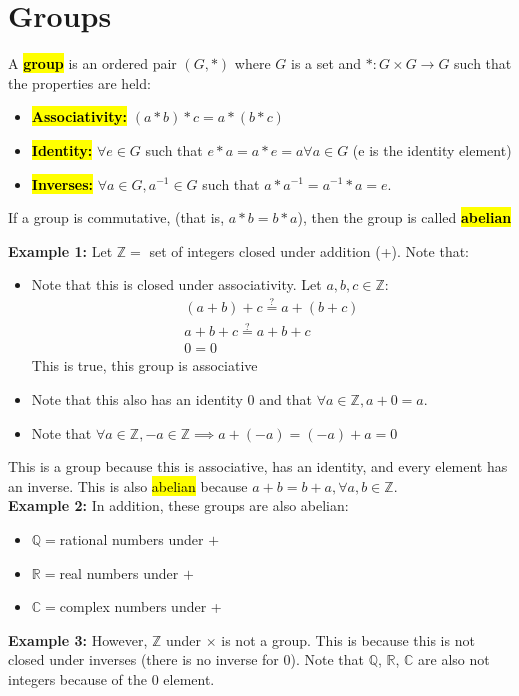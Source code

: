 \documentclass[12pt]{report}
\newcommand{\remarks}[1]{{\leavevmode\color{blue} #1}}
\newcommand{\examples}[1]{{\leavevmode\color{red} #1}}
\newcommand{\notes}[1]{{\leavevmode\color{OliveGreen} #1}}
\begin{document}
	\section{Groups}
	\notes{
		A \hl{\textbf{group}} is an ordered pair $(G,*)$ where $G$ is a set and $*:G\times G\to G$ such that the properties are held: 
		\begin{itemize}
			\item \hl{\textbf{Associativity: }}$(a*b)*c=a*(b*c)$
			\item \hl{\textbf{Identity: }}$\forall e\in G$ such that $e*a=a*e=a\forall a\in G$ (e is the identity element)
			\item \hl{\textbf{Inverses: }}$\forall a\in G, a^{-1}\in G$ such that $a*a^{-1}=a^{-1}*a=e$. 
		\end{itemize}
	}
	\remarks{
		If a group is commutative, (that is, $a*b=b*a$), then the group is called \hl{\textbf{abelian}}
	}\\
	\vskip 0.2in
	\examples{
		\textbf{Example 1: }Let $\mathbb{Z}=$ set of integers closed under addition (+). Note that: 
		\begin{itemize}
			\item Note that this is closed under associativity. Let $a,b,c\in \mathbb{Z}$: 
			\begin{gather}
				(a+b)+c\stackrel{?}{=}a+(b+c)\\
				a+b+c\stackrel{?}{=}a+b+c\\
				0=0
			\end{gather}
			This is true, this group is associative
			\item Note that this also has an identity $0$ and that $\forall a\in \mathbb{Z}, a+0=a$.\\ 
			\item  Note that $\forall a\in \mathbb{Z}, -a\in \mathbb{Z}\implies a+(-a)=(-a)+a=0$
		\end{itemize}
		This is a group because this is associative, has an identity, and every element has an inverse. This is also \hl{abelian} because $a+b=b+a, \forall a,b\in \mathbb{Z}$. \\
		\vskip 0.1in
		\textbf{Example 2: } In addition, these groups are also abelian: 
		\begin{itemize}
			\item $\mathbb{Q}=$rational numbers under $+$\\
			\item $\mathbb{R}=$real numbers under $+$\\
			\item $\mathbb{C}=$complex numbers under +
		\end{itemize}
		\vskip 0.1in
		\textbf{Example 3: } However, $\mathbb{Z}$ under $\times$ is not a group. This is because this is not closed under inverses (there is no inverse for 0). Note that $\mathbb{Q}$, $\mathbb{R}$, $\mathbb{C}$ are also not integers because of the 0 element. 
	}
\end{document}
